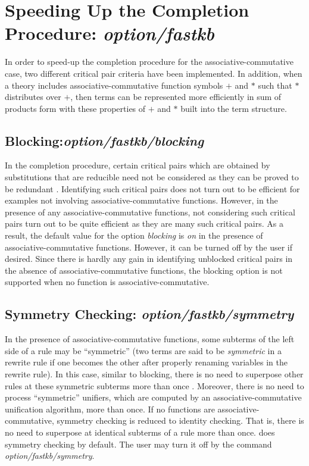 \section{Speeding Up the Completion Procedure: \em option/fastkb}

In order to speed-up the completion procedure for the associative-commutative
case, two different critical pair criteria have been implemented. In addition,
when a theory includes associative-commutative function symbols $+$ and $*$
such that $*$ distributes over $+$, then terms can be represented
more efficiently in sum of products form with these properties
of $+$ and $*$ built into the term structure.
  
\subsection{Blocking:\em option/fastkb/blocking}

In the completion procedure, certain critical pairs which are obtained
by substitutions that are reducible need not be considered as they
can be proved to be redundant \cite{KMN84}. Identifying such critical
pairs does not turn out to be efficient for examples not involving
associative-commutative functions. However, in the presence of any
associative-commutative functions, not considering such critical pairs
turn out to be quite efficient as they are many such critical pairs.
As a result, the default value for the option {\em blocking} is {\em
on} in the presence of associative-commutative functions.  However, it
can be turned off by the user if desired. Since there is
hardly any gain in identifying unblocked critical pairs in the
absence of associative-commutative functions, the blocking option
is not supported when no function is associative-commutative.

\subsection{Symmetry Checking: \em option/fastkb/symmetry}

In the presence of associative-commutative functions,
some subterms of the left side of a rule may be ``symmetric''
(two terms are said to be {\em symmetric} in a rewrite rule
if one becomes the other after properly renaming variables in 
the rewrite rule).
In this case, similar to blocking, there is no need to superpose
other rules at these symmetric subterms more than once \cite{ZK89}.
Moreover, there is no need to process ``symmetric'' unifiers,
which are computed by an associative-commutative unification
algorithm, more than once. 
If no functions are associative-commutative, symmetry checking
is reduced to identity checking. That is, there is 
no need to superpose at identical subterms of a rule more than once.
\RRL does symmetry checking by default. 
The user may turn it off by the command {\em option/fastkb/symmetry}.

